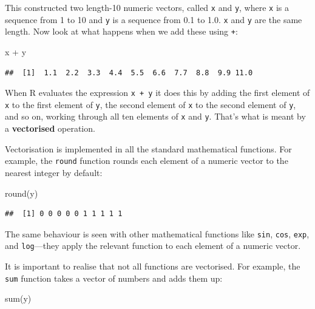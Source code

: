 \documentclass[
]{book}
\newenvironment{Shaded}{\begin{snugshade}}{\end{snugshade}}
\newcommand{\FunctionTok}[1]{\textcolor[rgb]{0.00,0.00,0.00}{#1}}
\newcommand{\NormalTok}[1]{#1}
\newcommand{\SpecialCharTok}[1]{\textcolor[rgb]{0.00,0.00,0.00}{#1}}
\begin{document}
This constructed two length-10 numeric vectors, called \texttt{x} and \texttt{y}, where \texttt{x} is a sequence from 1 to 10 and \texttt{y} is a sequence from 0.1 to 1.0. \texttt{x} and \texttt{y} are the same length. Now look at what happens when we add these using \texttt{+}:

\begin{Shaded}
\begin{Highlighting}[]
\NormalTok{x }\SpecialCharTok{+}\NormalTok{ y}
\end{Highlighting}
\end{Shaded}

\begin{verbatim}
##  [1]  1.1  2.2  3.3  4.4  5.5  6.6  7.7  8.8  9.9 11.0
\end{verbatim}

When R evaluates the expression \texttt{x\ +\ y} it does this by adding the first element of \texttt{x} to the first element of \texttt{y}, the second element of \texttt{x} to the second element of \texttt{y}, and so on, working through all ten elements of \texttt{x} and \texttt{y}. That's what is meant by a \textbf{vectorised} operation.

Vectorisation is implemented in all the standard mathematical functions. For example, the \texttt{round} function rounds each element of a numeric vector to the nearest integer by default:

\begin{Shaded}
\begin{Highlighting}[]
\FunctionTok{round}\NormalTok{(y)}
\end{Highlighting}
\end{Shaded}

\begin{verbatim}
##  [1] 0 0 0 0 0 1 1 1 1 1
\end{verbatim}

The same behaviour is seen with other mathematical functions like \texttt{sin}, \texttt{cos}, \texttt{exp}, and \texttt{log}---they apply the relevant function to each element of a numeric vector.

It is important to realise that not all functions are vectorised. For example, the \texttt{sum} function takes a vector of numbers and adds them up:

\begin{Shaded}
\begin{Highlighting}[]
\FunctionTok{sum}\NormalTok{(y)}
\end{Highlighting}
\end{Shaded}
\end{document}
